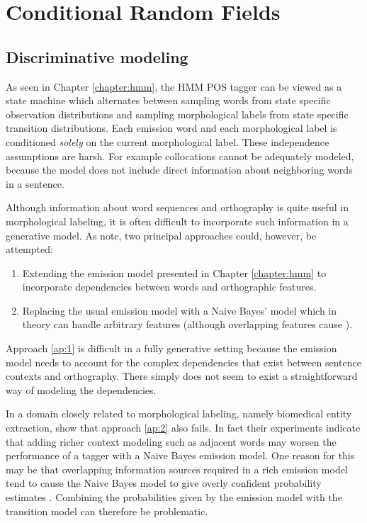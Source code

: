\chapter{Conditional Random Fields}
\label{chapter:crf}
\section{Discriminative modeling}

As seen in Chapter \ref{chapter:hmm}, the HMM POS tagger can be viewed
as a state machine which alternates between sampling words from state
specific observation distributions and sampling morphological labels
from state specific transition distributions. Each emission word and each
morphological label is conditioned {\it solely} on the current
morphological label. These independence assumptions are harsh. For example
collocations cannot be adequately modeled, because the model does not
include direct information about neighboring words in a sentence.

Although information about word sequences and orthography is quite
useful in morphological labeling, it is often difficult to incorporate
such information in a generative model. As \cite{Sutton2012} note, two
principal approaches could, however, be attempted:
\begin{enumerate}
\item Extending the emission model presented in Chapter
  \ref{chapter:hmm} to incorporate dependencies between words and
  orthographic features.\label{ap:1}
\item Replacing the usual emission model with a Naive
  Bayes' model which in theory can handle arbitrary
  features (although overlapping features cause ).\label{ap:2}
\end{enumerate}

Approach \ref{ap:1} is difficult in a fully generative setting because the
emission model needs to account for the complex dependencies that
exist between sentence contexts and orthography. There simply does not
seem to exist a straightforward way of modeling the dependencies.

In a domain closely related to morphological labeling, namely
biomedical entity extraction,\cite{Ruokolainen2013} show that approach
\ref{ap:2} also fails. In fact their experiments indicate that adding richer
context modeling such as adjacent words may worsen the performance of
a tagger with a Naive Bayes emission model. One reason for this may be
that overlapping information sources required in a rich emission model
tend to cause the Naive Bayes model to give overly confident
probability estimates \citep{Sutton2012}. Combining the probabilities
given by the emission model with the transition model can therefore be
problematic.

